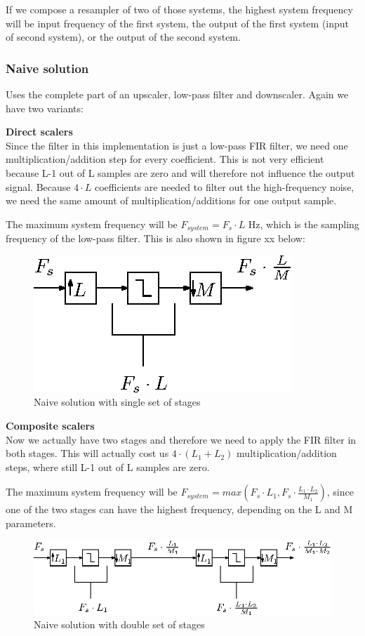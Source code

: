 \documentclass[a4paper,twoside,11pt, fleqn]{article}
\begin{document}
\smallskip
If we compose a resampler of two of those systems, the highest system frequency will be input frequency of the first system, the output of the first system (input of second system), or the output of the second system.

\subsubsection{Naive solution}
Uses the complete part of an upscaler, low-pass filter and downscaler. Again we have two variants:

\smallskip
\textbf{Direct scalers}\\
Since the filter in this implementation is just a low-pass FIR filter, we need one multiplication/addition step for every coefficient. This is not very efficient because L-1 out of L samples are zero and will therefore not influence the output signal. Because $4\cdot L$ coefficients are needed to filter out the high-frequency noise, we need the same amount of multiplication/additions for one output sample.

\smallskip
The maximum system frequency will be $F_{system} = F_s\cdot L$ Hz, which is the sampling frequency of the low-pass filter. This is also shown in figure xx below:
\begin{figure}[h]
	\includegraphics[scale = 1]{Images/3_0}
    \caption{Naive solution with single set of stages}
\end{figure}

\newpage
\textbf{Composite scalers } \\
Now we actually have two stages and therefore we need to apply the FIR filter in both stages. This will actually cost us $4\cdot (L_1 + L_2)$ multiplication/addition steps, where still L-1 out of L samples are zero.

\smallskip
The maximum system frequency will be $F_{system} = max(F_s\cdot L_1, F_s\cdot \frac{L_1\cdot L_2}{M_1})$, since one of the two stages can have the highest frequency, depending on the L and M parameters.
\begin{figure}[h]
	\includegraphics[scale = 1]{Images/3_1}
    \caption{Naive solution with double set of stages}
\end{figure}
\end{document}
